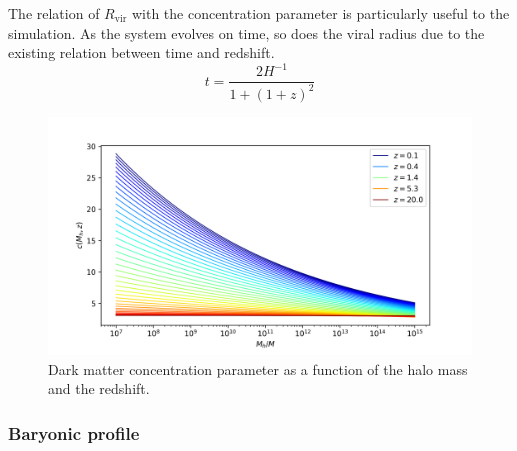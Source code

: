 		The relation of $R_\text{vir}$ with the concentration parameter is particularly useful to the simulation. As the system evolves on time, so does the viral radius due to the existing relation between time and redshift.
		\begin{equation}\label{eq: t_redshift}
			t = \dfrac{2H^{-1}}{1 + (1 + z) ^ 2}
		\end{equation}
	
		\begin{figure}[h]
			\centering
			\includegraphics[width=0.7\linewidth]{"../Files/Week 3/darkmatter_concentration"}
			\caption{Dark matter concentration parameter as a function of the halo mass and the redshift.}
			\label{fig: dmconcentration}
		\end{figure}
	
		\subsubsection{Baryonic profile}
	
